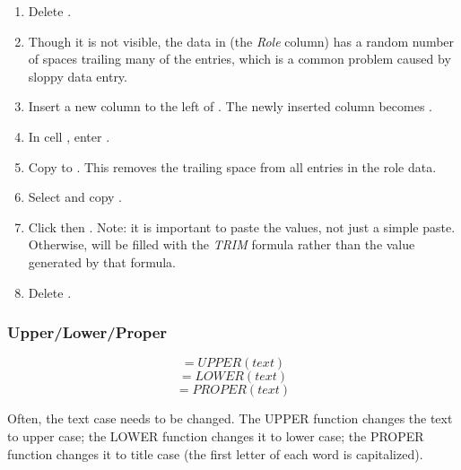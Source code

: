 \begin{enumbox}
\begin{enumerate}
		\item Delete .
		\item Though it is not visible, the data in  (the \textit{Role} column) has a random number of spaces trailing many of the entries, which is a common problem caused by sloppy data entry.
		\item Insert a new column to the left of . The newly inserted column becomes .
		\item In cell , enter .
		\item Copy  to . This removes the trailing space from all entries in the role data.
		\item Select and copy .
		\item Click  then . Note: it is important to paste the values, not just a simple paste. Otherwise,  will be filled with the \textit{TRIM} formula rather than the value generated by that formula.
		\item Delete .
	\end{enumerate}
\end{enumbox}

\subsubsection{Upper/Lower/Proper}

\[ =UPPER(text) \]
\[ =LOWER(text) \]
\[ =PROPER(text) \]

Often, the text case needs to be changed. The UPPER function changes the text to upper case; the LOWER function changes it to lower case; the PROPER function changes it to title case (the first letter of each word is capitalized). 

